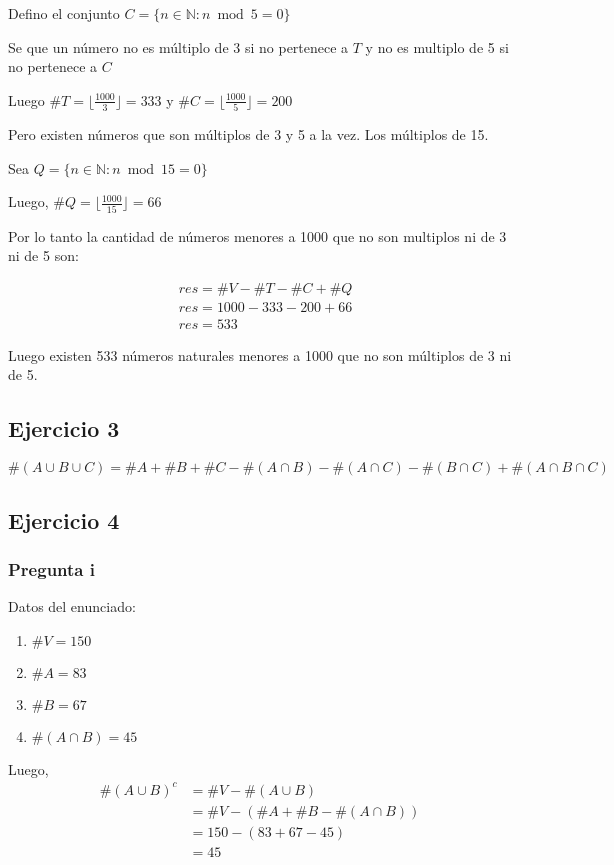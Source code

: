 Defino el conjunto $ C = \{ n \in \mathbb{N}: n \bmod 5 = 0 \} $

Se que un número no es múltiplo de 3 si no pertenece a $T$ y no es multiplo de 5 si no pertenece a $C$

Luego $ \#T = \lfloor \frac{1000}{3} \rfloor = 333 $ y $ \#C = \lfloor \frac{1000}{5} \rfloor = 200 $

Pero existen números que son múltiplos de 3 y 5 a la vez. Los múltiplos de 15.

Sea $ Q = \{ n \in \mathbb{N}: n \bmod 15 = 0 \} $

Luego, $\#Q = \lfloor \frac{1000}{15} \rfloor = 66 $

Por lo tanto la cantidad de números menores a 1000 que no son multiplos ni de 3 ni de 5 son:

\begin{align*}
    & res = \#V - \#T - \#C + \#Q \\
    & res = 1000 - 333 - 200 + 66 \\
    & res = 533
\end{align*}

Luego existen 533 números naturales menores a 1000 que no son múltiplos de 3 ni de 5.

\subsection{Ejercicio 3}

$ \#(A \cup B \cup C) = \#A + \#B+ \#C - \#(A \cap B) - \#(A \cap C) - \#(B \cap C) + \#(A \cap B \cap C) $

\subsection{Ejercicio 4}
\subsubsection{Pregunta i}

Datos del enunciado:
\begin{enumerate}
    \item $ \#V = 150 $
    \item $ \#A = 83 $
    \item $ \#B = 67 $
    \item $ \#(A \cap B) = 45 $
\end{enumerate}

Luego,
\begin{align*}
    \#(A \cup B)^c &= \#V - \#(A\cup B) \\
    &= \#V - (\#A + \#B - \#(A \cap B)) \\
    &= 150 - (83 + 67 - 45) \\
    &= 45 \\
\end{align*}

